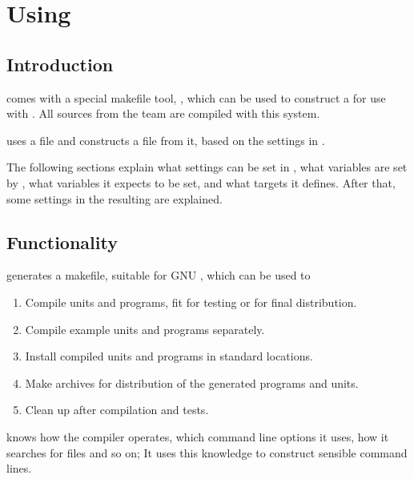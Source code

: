 
\chapter{Using }
\label{ch:makefile}
\newcommand{\mvar}[1]{\var{\$(#1)}}
\newcommand{\fpcmake}{\file{fpcmake}}
\section{Introduction}
\fpc comes with a special makefile tool, \fpcmake{}, which can be
used to construct a  for use with \gnu {}.
All sources from the \fpc team are compiled with this system.

\fpcmake{} uses a file  and constructs a file
 from it, based on the settings in .

The following sections explain what settings can be set in ,
what variables are set by , what variables it expects to be set,
and what targets it defines. After that, some settings in the resulting
 are explained.

\section{Functionality}
\label{se:fpcmakefunctionality}
 generates a makefile, suitable for GNU , 
which can be used to 
\begin{enumerate}
\item Compile units and programs, fit for testing or for final distribution.
\item Compile example units and programs separately.
\item Install compiled units and programs in standard locations.
\item Make archives for distribution of the generated programs and units.
\item Clean up after compilation and tests.
\end{enumerate}
 knows how the \fpc compiler operates, which command line
options it uses, how it searches for files and so on; It uses this knowledge
to construct sensible command lines. 

